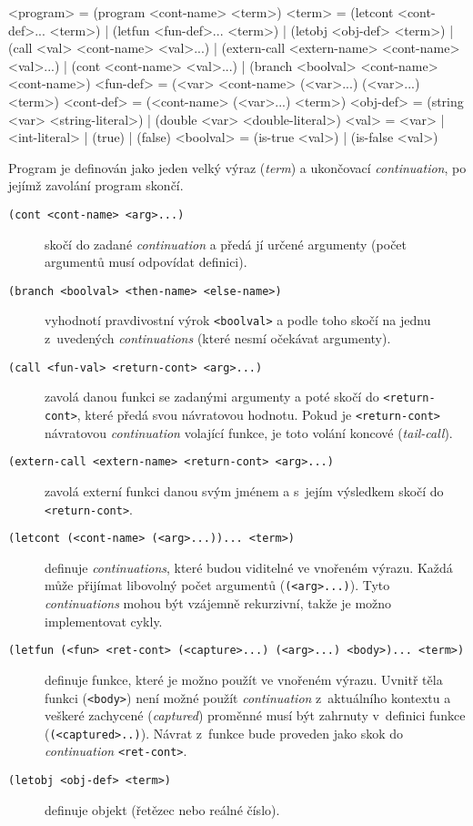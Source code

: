 \begin{gram}
<program>   = (program <cont-name> <term>)
<term>      = (letcont <cont-def>... <term>)
            | (letfun <fun-def>... <term>)
            | (letobj <obj-def> <term>)
            | (call <val> <cont-name> <val>...)
            | (extern-call <extern-name> <cont-name> <val>...)
            | (cont <cont-name> <val>...)
            | (branch <boolval> <cont-name> <cont-name>)
<fun-def>   = (<var> <cont-name> (<var>...) (<var>...) <term>)
<cont-def>  = (<cont-name> (<var>...) <term>)
<obj-def>   = (string <var> <string-literal>)
            | (double <var> <double-literal>)
<val>       = <var> | <int-literal> | (true) | (false)
<boolval>   = (is-true <val>) | (is-false <val>)
\end{gram}


Program je definován jako jeden velký výraz (\emph{term}) a ukončovací
\emph{continuation}, po jejímž zavolání program skončí.

\begin{description}
\item[\texttt{(cont <cont-name> <arg>...)}] skočí do zadané \emph{continuation}
  a předá jí určené argumenty (počet argumentů musí odpovídat definici).

\item[\texttt{(branch <boolval> <then-name> <else-name>)}] vyhodnotí
  pravdivostní výrok \texttt{<boolval>} a podle toho skočí na jednu z~uvedených
  \emph{continuations} (které nesmí očekávat argumenty).

\item[\texttt{(call <fun-val> <return-cont> <arg>...)}] zavolá danou funkci se
  zadanými argumenty a poté skočí do \texttt{<return-cont>}, které předá svou
  návratovou hodnotu. Pokud je \texttt{<return-cont>} návratovou
  \emph{continuation} volající funkce, je toto volání koncové
  (\emph{tail-call}).

\item[\texttt{(extern-call <extern-name> <return-cont> <arg>...)}] zavolá
  externí funkci danou svým jménem a s~jejím výsledkem skočí do
  \texttt{<return-cont>}.

\item[\texttt{(letcont (<cont-name> (<arg>...))... <term>)}] definuje
  \emph{continuations}, které budou viditelné ve vnořeném výrazu. Každá může
  přijímat libovolný počet argumentů (\texttt{(<arg>...)}). Tyto
  \emph{continuations} mohou být vzájemně rekurzivní, takže je možno
  implementovat cykly.

\item[\texttt{(letfun (<fun> <ret-cont> (<capture>...) (<arg>...) <body>)...
  <term>)}] definuje funkce, které je možno použít ve vnořeném výrazu. Uvnitř těla
  funkci (\texttt{<body>}) není možné použít \emph{continuation} z~aktuálního
  kontextu a veškeré zachycené (\emph{captured}) proměnné musí být zahrnuty
  v~definici funkce (\texttt{(<captured>..)}). Návrat z~funkce bude proveden jako
  skok do \emph{continuation} \texttt{<ret-cont>}.

\item[\texttt{(letobj <obj-def> <term>)}] definuje objekt (řetězec nebo
  reálné číslo).
\end{description}


